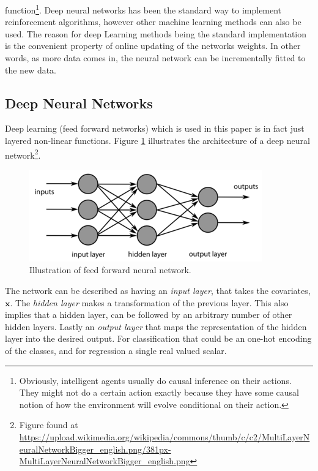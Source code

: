 function\footnote{Obviously, intelligent agents usually do causal inference on their actions. They might not do a certain action exactly because they have some causal notion of how the environment will evolve conditional on their action.}. Deep neural networks has been the standard way to implement reinforcement algorithms, however other machine learning methods can also be used. The reason for deep Learning methods being the standard implementation is the convenient property of online updating of the networks weights. In other words, as more data comes in, the neural network can be incrementally fitted to the new data.

\subsection{Deep Neural Networks}

Deep learning (feed forward networks) which is used in this paper is in fact just layered non-linear functions. Figure \ref{fig:feedforwardnetwork} illustrates the architecture of a deep neural network\footnote{Figure found at \url{https://upload.wikimedia.org/wikipedia/commons/thumb/c/c2/MultiLayerNeuralNetworkBigger_english.png/381px-MultiLayerNeuralNetworkBigger_english.png}}.

\begin{figure}[ht]
    \centering
    \includegraphics[scale=0.6]{figures/feedforwardnetworkillustration.png}
    \caption{Illustration of feed forward neural network. }
    \label{fig:feedforwardnetwork}
\end{figure}

The network can be described as having an \textit{input layer}, that takes the covariates, $\textbf{x}$. The \textit{hidden layer} makes a transformation of the previous layer. This also implies that a hidden layer, can be followed by an arbitrary number of other hidden layers. Lastly an \textit{output layer} that maps the representation of the hidden layer into the desired output. For classification that could be an one-hot encoding of the classes, and for regression a single real valued scalar.

